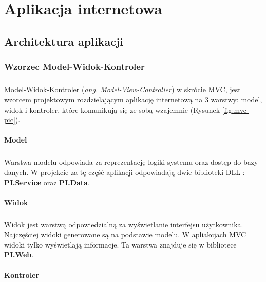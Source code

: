 \chapter{Aplikacja internetowa}

\label{cha:webapp}

\section{Architektura aplikacji} %
\label{sec:architektura_aplikacji}

\subsection{Wzorzec Model-Widok-Kontroler} %
\label{sub:wzorzec_model_widok_kontroler}
\paragraph{} %
\label{par:paragraph_name}
Model-Widok-Kontroler (\textit{ang. Model-View-Controller}) w skrócie MVC, jest wzorcem projektowym rozdzielającym aplikację internetową na 3 warstwy: model, widok i kontroler, które komunikują się ze sobą wzajemnie (Rysunek \ref{fig:mvc-pic}). 

\subsubsection{Model}
\paragraph{}
Warstwa modelu odpowiada za reprezentację logiki systemu oraz dostęp do bazy danych. W projekcie za tę część aplikacji odpowiadają dwie biblioteki DLL : \textbf{PI.Service} oraz \textbf{PI.Data}.

\subsubsection{Widok}
\paragraph{}
Widok jest warstwą odpowiedzialną za wyświetlanie interfejsu użytkownika. Najczęściej widoki generowane są na podstawie modelu. W apliakcjach MVC widoki tylko wyświetlają informacje. Ta warstwa znajduje się w bibliotece \textbf{PI.Web}.

\subsubsection{Kontroler}
